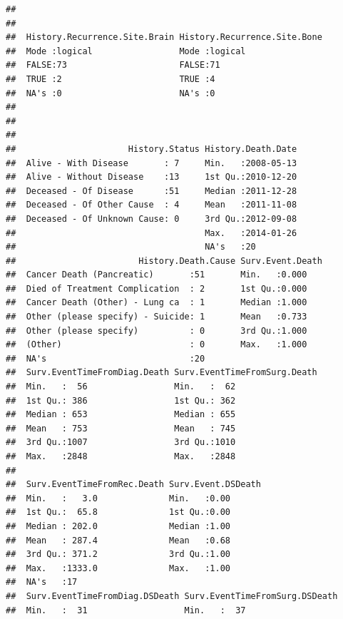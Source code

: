 \documentclass{article}\usepackage[]{graphicx}\usepackage[]{color}
\makeatletter
\newenvironment{kframe}{%
 \def\at@end@of@kframe{}%
 \ifinner\ifhmode%
  \def\at@end@of@kframe{\end{minipage}}%
  \begin{minipage}{\columnwidth}%
 \fi\fi%
 \def\FrameCommand##1{\hskip\@totalleftmargin \hskip-\fboxsep
 \colorbox{shadecolor}{##1}\hskip-\fboxsep
     \hskip-\linewidth \hskip-\@totalleftmargin \hskip\columnwidth}%
 \MakeFramed {\advance\hsize-\width
   \@totalleftmargin\z@ \linewidth\hsize
   \@setminipage}}%
 {\par\unskip\endMakeFramed%
 \at@end@of@kframe}
\newenvironment{knitrout}{}{} %
\makeatother
\begin{document}
\begin{knitrout}
\begin{kframe}
\begin{verbatim}
##                                                            
##                                                            
##  History.Recurrence.Site.Brain History.Recurrence.Site.Bone
##  Mode :logical                 Mode :logical               
##  FALSE:73                      FALSE:71                    
##  TRUE :2                       TRUE :4                     
##  NA's :0                       NA's :0                     
##                                                            
##                                                            
##                                                            
##                      History.Status History.Death.Date  
##  Alive - With Disease       : 7     Min.   :2008-05-13  
##  Alive - Without Disease    :13     1st Qu.:2010-12-20  
##  Deceased - Of Disease      :51     Median :2011-12-28  
##  Deceased - Of Other Cause  : 4     Mean   :2011-11-08  
##  Deceased - Of Unknown Cause: 0     3rd Qu.:2012-09-08  
##                                     Max.   :2014-01-26  
##                                     NA's   :20          
##                        History.Death.Cause Surv.Event.Death
##  Cancer Death (Pancreatic)       :51       Min.   :0.000   
##  Died of Treatment Complication  : 2       1st Qu.:0.000   
##  Cancer Death (Other) - Lung ca  : 1       Median :1.000   
##  Other (please specify) - Suicide: 1       Mean   :0.733   
##  Other (please specify)          : 0       3rd Qu.:1.000   
##  (Other)                         : 0       Max.   :1.000   
##  NA's                            :20                       
##  Surv.EventTimeFromDiag.Death Surv.EventTimeFromSurg.Death
##  Min.   :  56                 Min.   :  62                
##  1st Qu.: 386                 1st Qu.: 362                
##  Median : 653                 Median : 655                
##  Mean   : 753                 Mean   : 745                
##  3rd Qu.:1007                 3rd Qu.:1010                
##  Max.   :2848                 Max.   :2848                
##                                                           
##  Surv.EventTimeFromRec.Death Surv.Event.DSDeath
##  Min.   :   3.0              Min.   :0.00      
##  1st Qu.:  65.8              1st Qu.:0.00      
##  Median : 202.0              Median :1.00      
##  Mean   : 287.4              Mean   :0.68      
##  3rd Qu.: 371.2              3rd Qu.:1.00      
##  Max.   :1333.0              Max.   :1.00      
##  NA's   :17                                    
##  Surv.EventTimeFromDiag.DSDeath Surv.EventTimeFromSurg.DSDeath
##  Min.   :  31                   Min.   :  37                  

\end{verbatim}
\end{kframe}
\end{knitrout}
\end{document}
